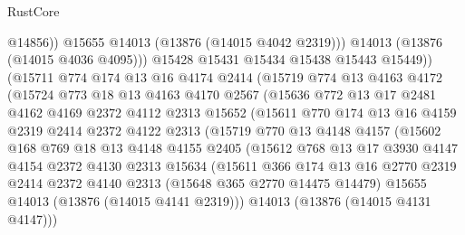 \begin{lexlean}{RustCore}
\begin{coremodule}
                      @14856))
                  @15655
                  @14013
                  (@13876 (@14015 @4042 @2319)))
                @14013
                (@13876 (@14015 @4036 @4095)))
              @15428
              @15431
              @15434
              @15438
              @15443
              @15449))
          (@15711
            @774
            @174
            @13
            @16
            @4174
            @2414
            (@15719
              @774
              @13
              @4163
              @4172
              (@15724
                @773
                @18
                @13
                @4163
                @4170
                @2567
                (@15636
                  @772
                  @13
                  @17
                  @2481
                  @4162
                  @4169
                  @2372
                  @4112
                  @2313
                  @15652
                  (@15611
                    @770
                    @174
                    @13
                    @16
                    @4159
                    @2319
                    @2414
                    @2372
                    @4122
                    @2313
                    (@15719
                      @770
                      @13
                      @4148
                      @4157
                      (@15602
                        @168
                        @769
                        @18
                        @13
                        @4148
                        @4155
                        @2405
                        (@15612
                          @768
                          @13
                          @17
                          @3930
                          @4147
                          @4154
                          @2372
                          @4130
                          @2313
                          @15634
                          (@15611
                            @366
                            @174
                            @13
                            @16
                            @2770
                            @2319
                            @2414
                            @2372
                            @4140
                            @2313
                            (@15648 @365 @2770 @14475 @14479)
                            @15655
                            @14013
                            (@13876 (@14015 @4141 @2319)))
                          @14013
                          (@13876 (@14015 @4131 @4147)))

\end{coremodule}
\end{lexlean}
